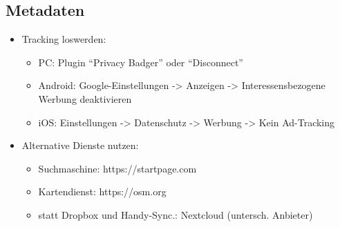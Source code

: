 \subsection*{Metadaten}
\begin{itemize}
  \item Tracking loswerden:
  \begin{itemize}
    \item PC: Plugin ``Privacy Badger'' oder ``Disconnect''
    \item Android: Google-Einstellungen -> Anzeigen -> Interessensbezogene Werbung deaktivieren
    \item iOS: Einstellungen -> Datenschutz -> Werbung -> Kein Ad-Tracking
  \end{itemize}
  \item Alternative Dienste nutzen:
  \begin{itemize}
    \item Suchmaschine: https://startpage.com
    \item Kartendienst: https://osm.org
    \item statt Dropbox und Handy-Sync.: Nextcloud (untersch. Anbieter)
  \end{itemize}
\end{itemize}
